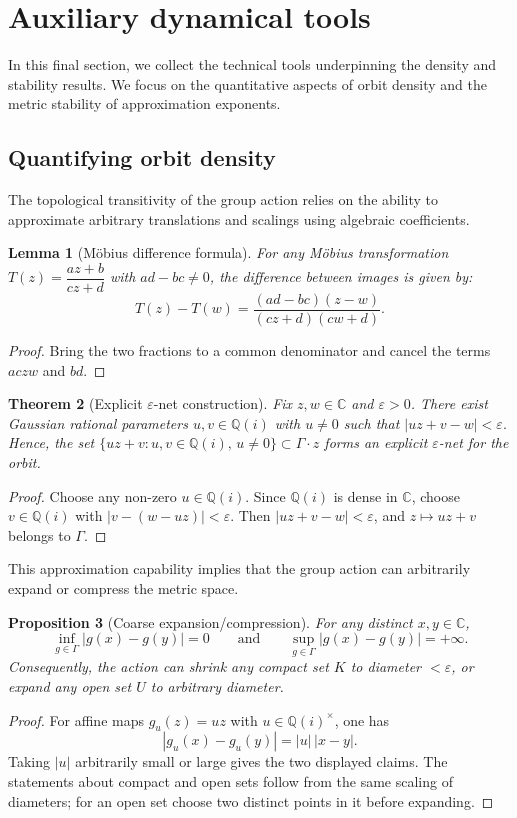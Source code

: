 \documentclass[11pt,a4paper]{article}
\theoremstyle{plain}
\newtheorem{theorem}{Theorem}[section]
\newtheorem{lemma}[theorem]{Lemma}
\newtheorem{proposition}[theorem]{Proposition}
\theoremstyle{definition}
\newcommand{\C}{\mathbb{C}}
\newcommand{\Q}{\mathbb{Q}}
\begin{document}
\section{Auxiliary dynamical tools}\label{sec:tools}

In this final section, we collect the technical tools underpinning the density and stability results. We focus on the quantitative aspects of orbit density and the metric stability of approximation exponents.

\subsection{Quantifying orbit density}

The topological transitivity of the group action relies on the ability to approximate arbitrary translations and scalings using algebraic coefficients.

\begin{lemma}[Möbius difference formula]\label{lem:mob-difference}
	For any M\"obius transformation $T(z)=\dfrac{az+b}{cz+d}$ with $ad-bc\ne0$, the difference between images is given by:
	\[
		T(z)-T(w)=\frac{(ad-bc)(z-w)}{(cz+d)(cw+d)}.
	\]
\end{lemma}
\begin{proof}
	Bring the two fractions to a common denominator and cancel the terms $acz w$ and $bd$.
\end{proof}

\begin{theorem}[Explicit $\varepsilon$-net construction]\label{thm:epsilon-net}
	Fix $z,w\in\C$ and $\varepsilon>0$. There exist Gaussian rational parameters $u,v\in\Q(i)$ with $u\neq0$ such that
	\(
	|uz+v-w|<\varepsilon.
	\)
	Hence, the set $\{uz+v:u,v\in\Q(i),\,u\ne0\}\subset\Gamma\cdot z$ forms an explicit $\varepsilon$-net for the orbit.
\end{theorem}
\begin{proof}
	Choose any non-zero $u\in\Q(i)$. Since $\Q(i)$ is dense in $\C$, choose $v\in\Q(i)$ with $|v-(w-uz)|<\varepsilon$. Then $|uz+v-w|<\varepsilon$, and $z\mapsto uz+v$ belongs to $\Gamma$.
\end{proof}

This approximation capability implies that the group action can arbitrarily expand or compress the metric space.

\begin{proposition}[Coarse expansion/compression]\label{prop:coarse-expansion}
	For any distinct $x,y\in\C$,
	\[
		\inf_{g\in\Gamma}|g(x)-g(y)|=0
		\qquad\text{and}\qquad
		\sup_{g\in\Gamma}|g(x)-g(y)|=+\infty.
	\]
	Consequently, the action can shrink any compact set $K$ to diameter $<\varepsilon$, or expand any open set $U$ to arbitrary diameter.
\end{proposition}
\begin{proof}
	For affine maps $g_u(z)=uz$ with $u\in\Q(i)^\times$, one has
	\[
		|g_u(x)-g_u(y)|=|u|\,|x-y|.
	\]
	Taking $|u|$ arbitrarily small or large gives the two displayed claims. The statements about compact and open sets follow from the same scaling of diameters; for an open set choose two distinct points in it before expanding.
\end{proof}
\end{document}
